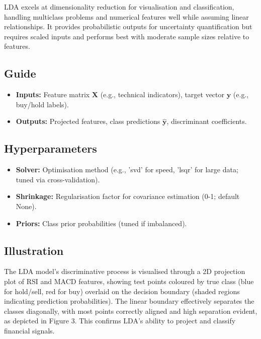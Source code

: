 \documentclass{article}
\begin{document}
LDA excels at dimensionality reduction for visualisation and classification, handling multiclass problems and numerical features well while assuming linear relationships. It provides probabilistic outputs for uncertainty quantification but requires scaled inputs and performs best with moderate sample sizes relative to features.

\subsection{Guide}

\begin{itemize}
\item \textbf{Inputs:} Feature matrix $\mathbf{X}$ (e.g., technical indicators), target vector $\mathbf{y}$ (e.g., buy/hold labels).
\item \textbf{Outputs:} Projected features, class predictions $\hat{\mathbf{y}}$, discriminant coefficients.
\end{itemize}

\subsection{Hyperparameters}

\begin{itemize}
\item \textbf{Solver:} Optimisation method (e.g., 'svd' for speed, 'lsqr' for large data; tuned via cross-validation).
\item \textbf{Shrinkage:} Regularisation factor for covariance estimation (0-1; default None).
\item \textbf{Priors:} Class prior probabilities (tuned if imbalanced).
\end{itemize}

\subsection{Illustration}

The LDA model's discriminative process is visualised through a 2D projection plot of RSI and MACD features, showing test points coloured by true class (blue for hold/sell, red for buy) overlaid on the decision boundary (shaded regions indicating prediction probabilities). The linear boundary effectively separates the classes diagonally, with most points correctly aligned and high separation evident, as depicted in Figure 3. This confirms LDA's ability to project and classify financial signals.
\end{document}
